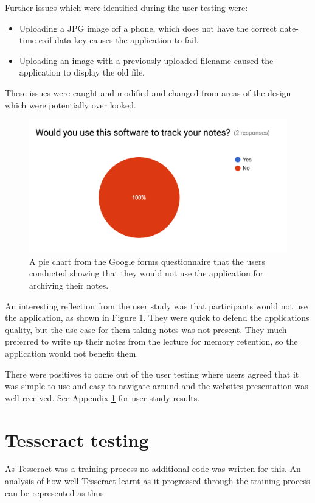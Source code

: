 Further issues which were identified during the user testing were:
\begin{itemize}
  \item Uploading a JPG image off a phone, which does not have the correct date-time exif-data key causes the application to fail.
  \item Uploading an image with a previously uploaded filename caused the application to display the old file.
\end{itemize}

These issues were caught and modified and changed from areas of the design which were potentially over looked.

\begin{figure}[h!]
  \centering
  \includegraphics[scale=0.5]{images/user_response}
  \caption{A pie chart from the Google forms questionnaire \cite{citeulike:14025272} that the users conducted showing that they would not use the application for archiving their notes.}
  \label{fig:user_response}
\end{figure}

An interesting reflection from the user study was that participants would not use the application, as shown in Figure \ref{fig:user_response}. They were quick to defend the applications quality, but the use-case for them taking notes was not present. They much preferred to write up their notes from the lecture for memory retention, so the application would not benefit them.

There were positives to come out of the user testing where users agreed that it was simple to use and easy to navigate around and the websites presentation was well received. See Appendix \ref{} for user study results.

\section{Tesseract testing}
As Tesseract was a training process no additional code was written for this. An analysis of how well Tesseract learnt as it progressed through the training process can be represented as thus.

